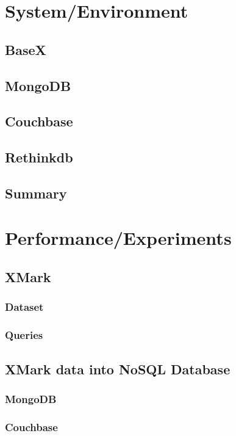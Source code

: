 \documentclass[a4paper,12pt]{article}
\begin{document}
	\section{System/Environment}
		\subsection{BaseX}
			
			
			\newpage
		\subsection{MongoDB}
		\subsection{Couchbase}
		\subsection{Rethinkdb}		
		\subsection{Summary}
	\newpage
	\section{Performance/Experiments}
		\subsection{XMark}
			\subsubsection{Dataset}
			\subsubsection{Queries}
		\subsection{XMark data into NoSQL Database}
			\subsubsection{MongoDB}
			\subsubsection{Couchbase}
\end{document}
